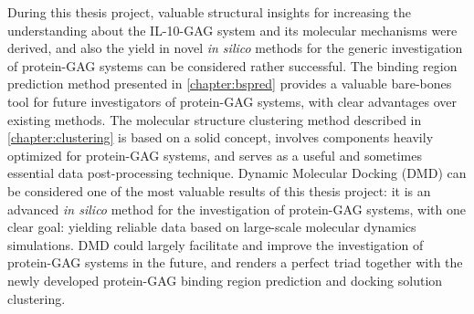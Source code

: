 During this thesis project, valuable structural insights for increasing the
understanding about the IL-10-GAG system and its molecular mechanisms were
derived, and also the yield in novel \textit{in silico} methods for the generic
investigation of protein-GAG systems can be considered rather successful. The
binding region prediction method presented in \cref{chapter:bspred} provides a
valuable bare-bones tool for future investigators of protein-GAG systems, with
clear advantages over existing methods. The molecular structure clustering
method described in \cref{chapter:clustering} is based on a solid concept,
involves components heavily optimized for protein-GAG systems, and serves as a
useful and sometimes essential data post-processing technique. Dynamic Molecular
Docking (DMD) can be considered one of the most valuable results of this thesis
project: it is an advanced \textit{in silico} method for the investigation of
protein-GAG systems, with one clear goal: yielding reliable data based on
large-scale molecular dynamics simulations. DMD could largely facilitate and
improve the investigation of protein-GAG systems in the future, and renders a
perfect triad together with the newly developed protein-GAG binding region
prediction and docking solution clustering.
